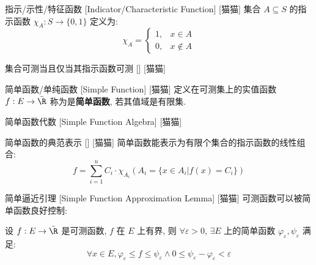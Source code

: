 \documentclass[UTF8]{ctexart}
\begin{document}
            \begin{dfn}
                {指示/示性/特征函数}
                [Indicator/Characteristic Function]
                [猫猫]
                集合 \(A\subseteq S\) 的指示函数 \(\chi_A:S\to\{0,1\}\) 定义为:
                \[\chi_A=
                \begin{cases}
                    1, & x\in A\\
                    0, & x\notin A
                \end{cases}\]
            \end{dfn}
            
            \begin{ppt}
                {集合可测当且仅当其指示函数可测}
                []
                [猫猫]
            \end{ppt}
            
            \begin{dfn}
                {简单函数/单纯函数}
                [Simple Function]
                [猫猫]
                定义在可测集上的实值函数 \(f:E\to\bar{\R}\) 称为是\textbf{简单函数}, 若其值域是有限集. 
            \end{dfn}
            
            \begin{ppt}
                {简单函数代数}
                [Simple Function Algebra]
                [猫猫]
            \end{ppt}
            
            \begin{ppt}
                {简单函数的典范表示}
                []
                [猫猫]
                简单函数能表示为有限个集合的指示函数的线性组合: 
                \[f=\sum_{i=1}^{n}C_i\cdot\chi_{A_i}(A_i=\{x\in A_i|f(x)=C_i\})\]
            \end{ppt}
            
            \begin{lma}
                {简单逼近引理}
                [Simple Function Approximation Lemma]
                [猫猫]
                可测函数可以被简单函数良好控制: 

                设 \(f:E\to\bar{\R}\) 是可测函数, \(f\) 在 \(E\) 上有界, 则 \(\forall\varepsilon>0\), \(\exists E\) 上的简单函数 \(\varphi_\varepsilon, \psi_\varepsilon\) 满足: 
                \[\forall x\in E, \varphi_\varepsilon\leq f\leq\psi_\varepsilon\wedge 0\leq\psi_\varepsilon-\varphi_\varepsilon<\varepsilon\]
            \end{lma}
            
\end{document}
